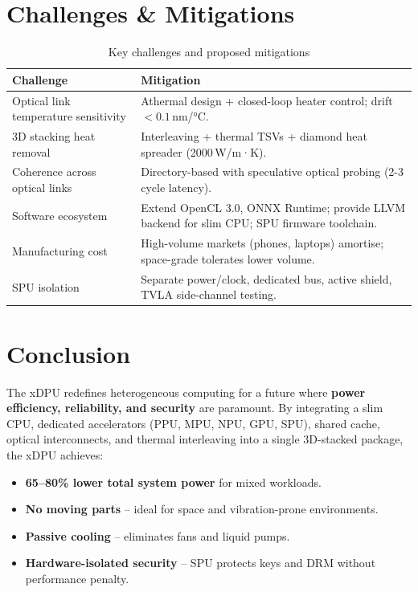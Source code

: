 \documentclass[10pt,twocolumn]{article}
\begin{document}
\section{Challenges \& Mitigations}

\begin{table}[ht]
\centering
\caption{Key challenges and proposed mitigations}
\label{tab:challenges}
\begin{tabular}{@{}lp{7cm}@{}}
\toprule
\textbf{Challenge} & \textbf{Mitigation} \\
\midrule
Optical link temperature sensitivity & Athermal design + closed-loop heater control; drift \(<0.1\) nm/°C. \\
3D stacking heat removal & Interleaving + thermal TSVs + diamond heat spreader (2000 W/m·K). \\
Coherence across optical links & Directory-based with speculative optical probing (2-3 cycle latency). \\
Software ecosystem & Extend OpenCL 3.0, ONNX Runtime; provide LLVM backend for slim CPU; SPU firmware toolchain. \\
Manufacturing cost & High-volume markets (phones, laptops) amortise; space-grade tolerates lower volume. \\
SPU isolation & Separate power/clock, dedicated bus, active shield, TVLA side-channel testing. \\
\bottomrule
\end{tabular}
\end{table}

\section{Conclusion}

The xDPU redefines heterogeneous computing for a future where \textbf{power efficiency, reliability, and security} are paramount. By integrating a slim CPU, dedicated accelerators (PPU, MPU, NPU, GPU, SPU), shared cache, optical interconnects, and thermal interleaving into a single 3D-stacked package, the xDPU achieves:
\begin{itemize}
\item \textbf{65–80\% lower total system power} for mixed workloads.
\item \textbf{No moving parts} – ideal for space and vibration-prone environments.
\item \textbf{Passive cooling} – eliminates fans and liquid pumps.
\item \textbf{Hardware-isolated security} – SPU protects keys and DRM without performance penalty.
\end{itemize}
\end{document}
